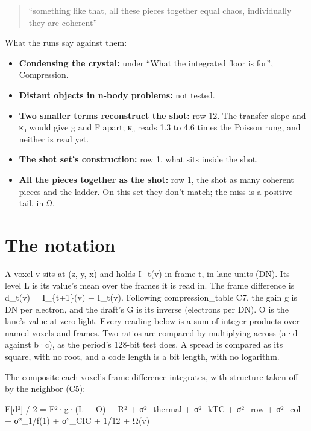 \begin{quote}
“something like that, all these pieces together equal chaos, individually they are coherent”

\end{quote}

What the runs say against them:

\begin{itemize}
\item \textbf{Condensing the crystal:} under “What the integrated floor is for”, Compression.
\item \textbf{Distant objects in n-body problems:} not tested.
\item \textbf{Two smaller terms reconstruct the shot:} row 12. The transfer slope and κ₃ would give g and F apart; κ₃ reads 1.3 to 4.6 times the Poisson rung, and neither is read yet.
\item \textbf{The shot set's construction:} row 1, what sits inside the shot.
\item \textbf{All the pieces together as the shot:} row 1, the shot as many coherent pieces and the ladder. On this set they don't match; the miss is a positive tail, in Ω.
\end{itemize}

\section{\texorpdfstring{The notation}{The notation}}

A voxel v sits at (z, y, x) and holds I\_\allowbreak{}t(v) in frame t, in lane units (DN). Its level L is its value's mean over the frames it is read in. The frame difference is d\_\allowbreak{}t(v) = I\_\allowbreak{}\{t+1\}(v) − I\_\allowbreak{}t(v). Following compression\_\allowbreak{}table C7, the gain g is DN per electron, and the draft's G is its inverse (electrons per DN). O is the lane's value at zero light. Every reading below is a sum of integer products over named voxels and frames. Two ratios are compared by multiplying across (a·d against b·c), as the period's 128-bit test does. A spread is compared as its square, with no root, and a code length is a bit length, with no logarithm.

The composite each voxel's frame difference integrates, with structure taken off by the neighbor (C5):

E[d²] / 2 = F²·g·(L − O) + R² + σ²\_\allowbreak{}thermal + σ²\_\allowbreak{}kTC + σ²\_\allowbreak{}row + σ²\_\allowbreak{}col + σ²\_\allowbreak{}1/f(1) + σ²\_\allowbreak{}CIC + 1/12 + Ω(v)

